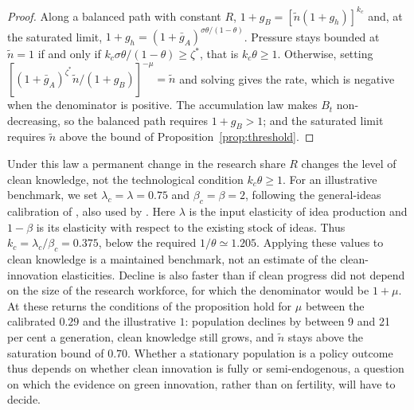 \documentclass[11pt]{article}
\begin{document}
\begin{proof}
Along a balanced path with constant $R$, $1+g_B=[\tilde n(1+g_h)]^{k_c}$ and, at the saturated limit,
$1+g_h=(1+\bar g_A)^{\sigma\theta/(1-\theta)}$. Pressure stays bounded at $\tilde n=1$ if and only if
$k_c\sigma\theta/(1-\theta)\ge\zeta^\ast$, that is $k_c\theta\ge1$. Otherwise, setting
$[(1+\bar g_A)^{\zeta^\ast}\tilde n/(1+g_B)]^{-\mu}=\tilde n$ and solving gives the rate, which is negative
when the denominator is positive. The accumulation law makes $B_t$ non-decreasing, so the balanced path
requires $1+g_B>1$; and the saturated limit requires $\tilde n$ above the bound of
Proposition~\ref{prop:threshold}.
\end{proof}

Under this law a permanent change in the research share $R$ changes the level of clean knowledge,
not the technological condition $k_c\theta\ge1$. For an illustrative benchmark, we set
$\lambda_c=\lambda=0.75$ and $\beta_c=\beta=2$, following the general-ideas calibration of
\citet[Table~2, p.~3510]{jones22}, also used by \citet[Section~2.4]{STRULIK2024104943}.
Here $\lambda$ is the input elasticity of idea production and $1-\beta$ is its elasticity with
respect to the existing stock of ideas. Thus $k_c=\lambda_c/\beta_c=0.375$, below the required
$1/\theta\simeq1.205$. Applying these values to clean knowledge is a maintained benchmark,
not an estimate of the clean-innovation elasticities. Decline is also faster than if clean progress did not depend on the size of
the research workforce, for which the denominator would be $1+\mu$. At these returns the conditions of
the proposition hold for $\mu$ between the calibrated $0.29$ and the illustrative $1$: population
declines by between 9 and 21 per cent a generation, clean knowledge still grows, and $\tilde n$ stays
above the saturation bound of $0.70$. Whether a stationary population is a policy outcome thus
depends on whether clean innovation is fully or semi-endogenous, a question on which the evidence on
green innovation, rather than on fertility, will have to decide.
\end{document}
